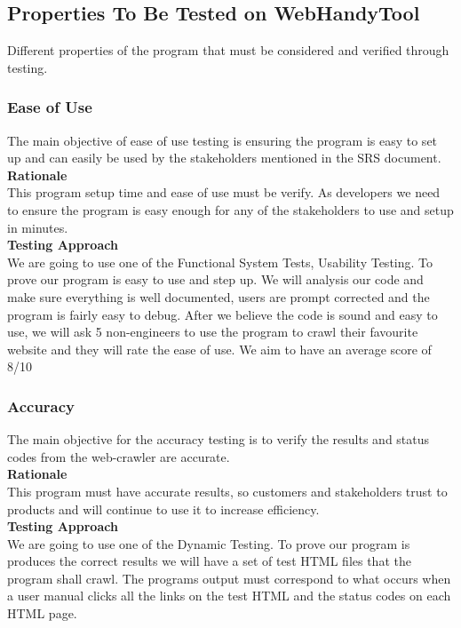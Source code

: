 \documentclass[12pt, titlepage]{article}
\begin{document}
\subsection{Properties To Be Tested on WebHandyTool}
Different properties of the program that must be considered and verified through testing.\\
\subsubsection{Ease of Use}
The main objective of ease of use testing is ensuring the program is easy to set up and can easily be used by the stakeholders mentioned in the SRS document.\\

\textbf{Rationale}  \\

This program setup time and ease of use must be verify. As developers we need to ensure the program is easy enough for any of the stakeholders to use and setup in minutes.\\

\textbf{Testing Approach} \\ 

 We are going to use one of the  Functional System Tests, Usability Testing. To prove our program is easy to use and step up. We will analysis our code and make sure everything is well documented, users are prompt corrected and the program is fairly easy to debug. After we believe the code is sound and easy to use, we will ask 5 non-engineers to use the program to crawl their favourite website and they will rate the ease of use. We aim to have an average score of 8/10

\subsubsection{Accuracy}
The main objective for the accuracy testing is to verify the results and status codes from the web-crawler are accurate.\\

\textbf{Rationale}  \\

This program must have accurate results, so customers and stakeholders trust to products and will continue to use it to increase efficiency.\\

\textbf{Testing Approach} \\ 

 We are going to use one of the  Dynamic Testing. To prove our program is produces the correct results we will have a set of test HTML files that the  program shall crawl. The programs output must correspond to what occurs when a user manual clicks all the links on the test HTML and the status codes on each HTML page.
\end{document}
